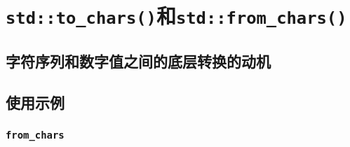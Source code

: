 \section{\texttt{std::to\_chars()}和\texttt{std::from\_chars()}}\label{ch31}

\subsection{字符序列和数字值之间的底层转换的动机}

\subsection{使用示例}
\subsubsection{\texttt{from\_chars}}\label{ch31.2.1}
